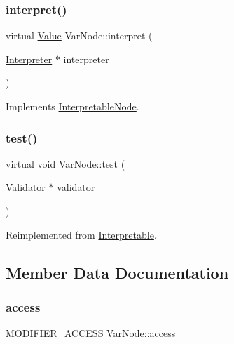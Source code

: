 \mbox{\label{classVarNode_af2eed4fcade96d174c5b1f623b6bcdf6}} 
\subsubsection{\texorpdfstring{interpret()}{interpret()}}
{\footnotesize\ttfamily virtual \hyperlink{classValue}{Value} Var\+Node\+::interpret (\begin{DoxyParamCaption}\item[{\hyperlink{classInterpreter}{Interpreter} $\ast$}]{interpreter }\end{DoxyParamCaption})\hspace{0.3cm}{\ttfamily [virtual]}}



Implements \hyperlink{classInterpretableNode_a9a466e7d65c4b323d2b96b4ac8396cd7}{Interpretable\+Node}.

\mbox{\label{classVarNode_afaca674319775ae5e8a4fb0e5ec7b59f}} 
\subsubsection{\texorpdfstring{test()}{test()}}
{\footnotesize\ttfamily virtual void Var\+Node\+::test (\begin{DoxyParamCaption}\item[{\hyperlink{classValidator}{Validator} $\ast$}]{validator }\end{DoxyParamCaption})\hspace{0.3cm}{\ttfamily [virtual]}}



Reimplemented from \hyperlink{classInterpretable_a32f547aaf68dcbab993284d3257ab010}{Interpretable}.



\subsection{Member Data Documentation}
\mbox{\label{classVarNode_a9d3115ee1b8fde5fe1b9484b57dba54a}} 
\subsubsection{\texorpdfstring{access}{access}}
{\footnotesize\ttfamily \hyperlink{statics_8h_a0cbe4939ec6da73b52afbebd794d60ba}{M\+O\+D\+I\+F\+I\+E\+R\+\_\+\+A\+C\+C\+E\+SS} Var\+Node\+::access}

